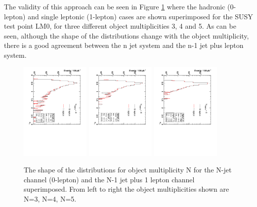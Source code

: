 The validity of this approach can be seen in Figure \ref{fig:aTnobj} where the hadronic (0-lepton) and single leptonic (1-lepton) cases are shown superimposed for the SUSY test point LM0, for three different object multiplicities 3, 4 and 5\cite{an2009_188}. As can be seen, although the shape of the \alt distributions change with the object multiplicity, there is a good agreement between the n jet system and the n-1 jet plus lepton system. 

\begin{figure}
\centering
\includegraphics[width=0.3\textwidth, angle=90]{Figures/AlphaT/aT_3}
\includegraphics[width=0.3\textwidth,angle=90]{Figures/AlphaT/aT_4}
\includegraphics[width=0.3\textwidth,angle=90]{Figures/AlphaT/aT_5}
\caption{\label{fig:aTnobj}The shape of the \alt distributions for object multiplicity N for the N-jet channel (0-lepton) and the N-1 jet plus 1 lepton channel superimposed. From left to right the object multiplicities shown are N=3, N=4, N=5.}
\end{figure}

